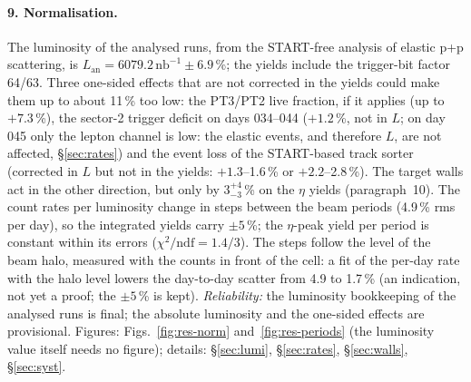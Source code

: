 \documentclass[11pt,a4paper]{article}
\newcommand{\nbinv}{\ensuremath{\mathrm{nb}^{-1}}\xspace}
\newcommand{\Lan}{\ensuremath{L_{\mathrm{an}}}\xspace}
\begin{document}
\paragraph{9. Normalisation.} The luminosity of the analysed runs, from the START-free analysis of elastic p+p scattering, is
$\Lan=6079.2\,\nbinv\pm6.9$\,\%; the yields include the trigger-bit factor 64/63. Three one-sided effects that are not corrected in
the yields could make them up to about 11\,\% too low: the PT3/PT2 live fraction, if it applies (up to $+7.3$\,\%), the sector-2
trigger deficit on days 034--044 ($+1.2$\,\%, not in $L$; on day 045 only the lepton channel is low: the elastic events, and therefore
$L$, are not affected, \S\ref{sec:rates}) and the event loss of the START-based track sorter (corrected in $L$ but
not in the yields: $+1.3$--1.6\,\% or $+2.2$--2.8\,\%). The target walls act in the other direction, but only by
$3^{+4}_{-3}$\,\% on the $\eta$ yields (paragraph~10). The count rates per luminosity change in steps between the beam
periods (4.9\,\% rms per day), so the integrated yields carry $\pm5$\,\%; the $\eta$-peak yield per period is constant
within its errors ($\chi^2/\mathrm{ndf}=1.4/3$). The steps follow the level of the beam halo, measured with the counts in front of the
cell: a fit of the per-day rate with the halo level lowers the day-to-day scatter from 4.9 to 1.7\,\% (an indication, not yet a proof;
the $\pm5$\,\% is kept). \emph{Reliability:} the luminosity bookkeeping of the analysed runs is final; the
absolute luminosity and the one-sided effects are provisional. Figures: Figs.~\ref{fig:res-norm} and~\ref{fig:res-periods} (the luminosity
value itself needs no figure); details: \S\ref{sec:lumi}, \S\ref{sec:rates}, \S\ref{sec:walls}, \S\ref{sec:syst}.
\end{document}
